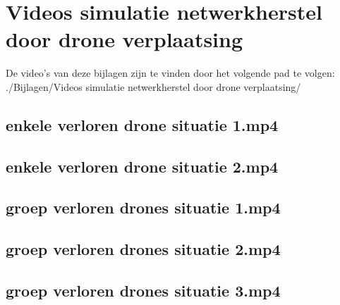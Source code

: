 \documentclass[a4paper, 11pt, oneside]{report}
\begin{document}
\chapter{Videos simulatie netwerkherstel door drone verplaatsing}\label{sec:videos-simulatie-netwerkherstel-door-drone-verplaatsing}
De video's van deze bijlagen zijn te vinden door het volgende pad te volgen: \newline
./Bijlagen/Videos simulatie netwerkherstel door drone verplaatsing/
\section{enkele verloren drone situatie 1.mp4}\label{sec:enkele-verloren-drone-situatie-1mp4}
\section{enkele verloren drone situatie 2.mp4}\label{sec:enkele-verloren-drone-situatie-2mp4}
\section{groep verloren drones situatie 1.mp4}\label{sec:groep-verloren-drones-situatie-1mp4}
\section{groep verloren drones situatie 2.mp4}\label{sec:groep-verloren-drones-situatie-2mp4}
\section{groep verloren drones situatie 3.mp4}\label{sec:groep-verloren-drones-situatie-3mp4}
\end{document}
